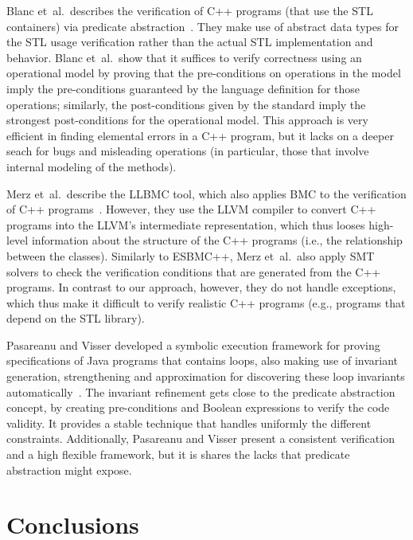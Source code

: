 \documentclass[a4paper]{llncs}
\begin{document}
Blanc et~al.\ describes the verification of C++ programs (that use the STL containers)
via predicate abstraction~\cite{Blanc07}. They make use of abstract data types for the STL
usage verification rather than the actual STL implementation and behavior.
Blanc et~al.\ show that it suffices to verify correctness using an operational model
by proving that the pre-conditions on operations in the model imply the pre-conditions
guaranteed by the language definition for those operations; similarly, the post-conditions
given by the standard imply the strongest post-conditions for the operational model.
This approach is very efficient in finding elemental errors in a C++ program, but it lacks
on a deeper seach for bugs and misleading operations (in particular, those that involve internal
modeling of the methods).

Merz et~al.\ describe the LLBMC tool, which also applies BMC to the verification
of C++ programs~\cite{Florian12}. However, they use the LLVM compiler to convert C++
programs into the LLVM's intermediate representation, which thus looses high-level
information about the structure of the C++ programs (i.e., the relationship between
the classes). Similarly to ESBMC++, Merz et~al.\ also apply SMT solvers to check the verification
conditions that are generated from the C++ programs. In contrast to our approach, however,
they do not handle exceptions, which thus make it difficult to verify realistic C++ programs
(e.g., programs that depend on the STL library).

Pasareanu and Visser developed a symbolic execution framework
for proving specifications of Java programs that contains loops,
also making use of invariant generation, strengthening and approximation
for discovering these loop invariants automatically~\cite{Pasareanu04}.
The invariant refinement gets close to the predicate abstraction concept,
by creating pre-conditions and Boolean expressions to verify the code validity.
It provides a stable technique that handles uniformly the different constraints.
Additionally, Pasareanu and Visser present a consistent verification and a high
flexible framework, but it is shares the lacks that predicate abstraction might
expose.

\section{Conclusions}
\end{document}
